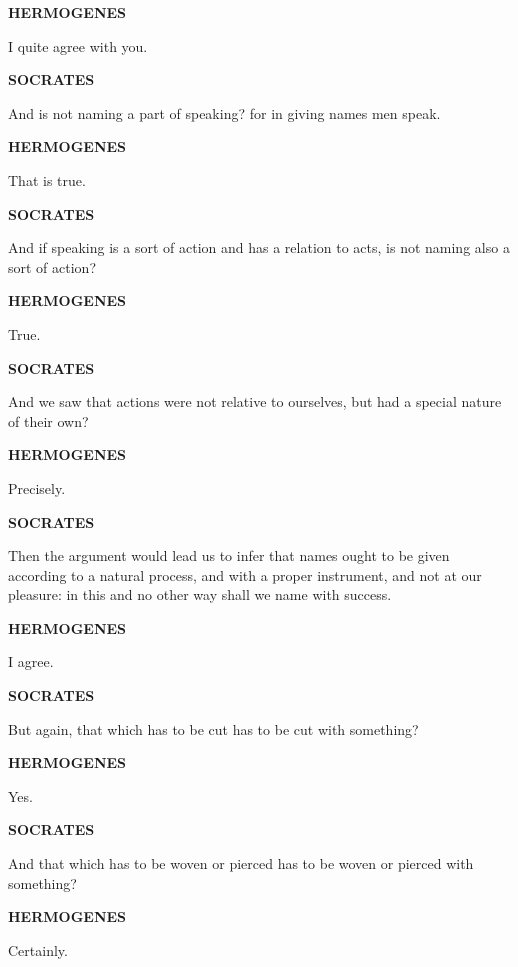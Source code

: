\documentclass[11pt,letter]{article}
\begin{document}
\par \textbf{HERMOGENES}
\par   I quite agree with you.

\par \textbf{SOCRATES}
\par   And is not naming a part of speaking? for in giving names men speak.

\par \textbf{HERMOGENES}
\par   That is true.

\par \textbf{SOCRATES}
\par   And if speaking is a sort of action and has a relation to acts, is not naming also a sort of action?

\par \textbf{HERMOGENES}
\par   True.

\par \textbf{SOCRATES}
\par   And we saw that actions were not relative to ourselves, but had a special nature of their own?

\par \textbf{HERMOGENES}
\par   Precisely.

\par \textbf{SOCRATES}
\par   Then the argument would lead us to infer that names ought to be given according to a natural process, and with a proper instrument, and not at our pleasure:  in this and no other way shall we name with success.

\par \textbf{HERMOGENES}
\par   I agree.

\par \textbf{SOCRATES}
\par   But again, that which has to be cut has to be cut with something?

\par \textbf{HERMOGENES}
\par   Yes.

\par \textbf{SOCRATES}
\par   And that which has to be woven or pierced has to be woven or pierced with something?

\par \textbf{HERMOGENES}
\par   Certainly.
\end{document}
